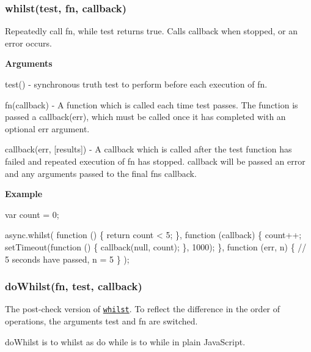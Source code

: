  \subsubsection*{whilst(test, fn, callback)}

Repeatedly call {\ttfamily fn}, while {\ttfamily test} returns {\ttfamily true}. Calls {\ttfamily callback} when stopped, or an error occurs.

{\bfseries Arguments}


\begin{DoxyItemize}
\item {\ttfamily test()} -\/ synchronous truth test to perform before each execution of {\ttfamily fn}.
\item {\ttfamily fn(callback)} -\/ A function which is called each time {\ttfamily test} passes. The function is passed a {\ttfamily callback(err)}, which must be called once it has completed with an optional {\ttfamily err} argument.
\item {\ttfamily callback(err, \mbox{[}results\mbox{]})} -\/ A callback which is called after the test function has failed and repeated execution of {\ttfamily fn} has stopped. {\ttfamily callback} will be passed an error and any arguments passed to the final {\ttfamily fn}\textquotesingle{}s callback.
\end{DoxyItemize}

{\bfseries Example}


\begin{DoxyCode}
var count = 0;

async.whilst(
    function () \{ return count < 5; \},
    function (callback) \{
        count++;
        setTimeout(function () \{
            callback(null, count);
        \}, 1000);
    \},
    function (err, n) \{
        // 5 seconds have passed, n = 5
    \}
);
\end{DoxyCode}
 



\label{_doWhilst}%
 \subsubsection*{do\+Whilst(fn, test, callback)}

The post-\/check version of \href{#whilst}{\tt {\ttfamily whilst}}. To reflect the difference in the order of operations, the arguments {\ttfamily test} and {\ttfamily fn} are switched.

{\ttfamily do\+Whilst} is to {\ttfamily whilst} as {\ttfamily do while} is to {\ttfamily while} in plain Java\+Script. 




